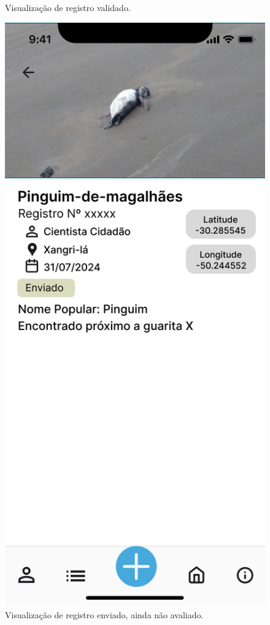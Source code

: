 \begin{figure}[H]
\begin{minipage}[b]{0.48\textwidth}
        \caption{Visualização de registro validado.}
        \label{fig:prototipo-ver-registro-validado}
    \end{minipage}
    \hfill
    \begin{minipage}[b]{0.48\textwidth}
        \centering
        \includegraphics[height=0.6\textheight]{imagens/ve-registro-enviado-figma.png}
        \caption{Visualização de registro enviado, ainda não avaliado.}
        \label{fig:prototipo-ver-registro-enviado}
    \end{minipage}
\end{figure}

